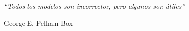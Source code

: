 \begin{dedication}
	\textit{“Todos los modelos son incorrectos, pero algunos son útiles”}
	
		George E. Pelham Box\\\vspace{0.7cm}
\end{dedication}